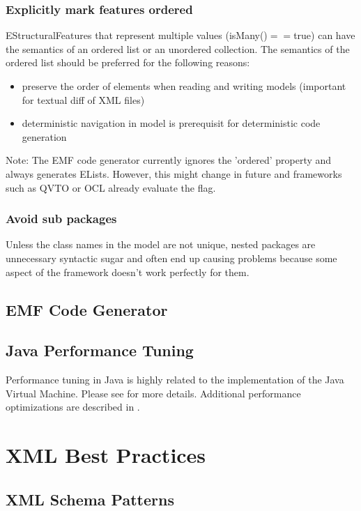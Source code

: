 \documentclass[11pt,a4paper]{article}
\begin{document}
\subsubsection{Explicitly mark features ordered}
EStructuralFeatures that represent multiple values (isMany()$==$true) can have the semantics of an ordered list or an unordered collection. The semantics of the ordered list should be preferred for the following reasons:
\begin{itemize}
\item preserve the order of elements when reading and writing models (important for textual diff of XML files)
\item deterministic navigation in model is prerequisit for deterministic code generation
\end{itemize}

Note: The EMF code generator currently ignores the 'ordered' property and always generates ELists. However, this might change in future and frameworks such as QVTO or OCL already evaluate the flag.

\subsubsection{Avoid sub packages}
Unless the class names in the model are not unique, nested packages are unnecessary syntactic sugar and often end up causing 
problems because some aspect of the framework doesn't work perfectly for them.


\subsection{EMF Code Generator}

\subsection{Java Performance Tuning}
Performance tuning in Java is highly related to the implementation of the Java Virtual Machine. Please see \cite{merks:performance} for more details.
Additional performance optimizations are described in \cite{steinberg:emfperformance}.\cite{merks:performance} 

\section{XML Best Practices}
\subsection{XML Schema Patterns}
\end{document}
